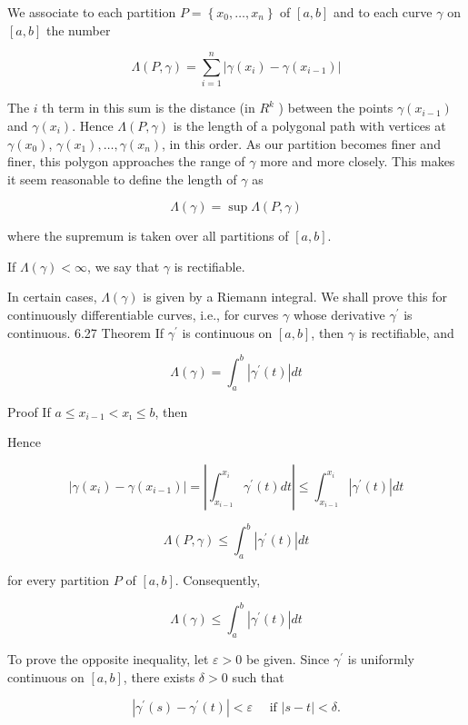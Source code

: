 \documentclass[10pt]{article}
\begin{document}
We associate to each partition $P=\left\{x_{0}, \ldots, x_{n}\right\}$ of $[a, b]$ and to each curve $\gamma$ on $[a, b]$ the number

$$
\Lambda(P, \gamma)=\sum_{i=1}^{n}\left|\gamma\left(x_{i}\right)-\gamma\left(x_{i-1}\right)\right|
$$

The $i$ th term in this sum is the distance (in $R^{k}$ ) between the points $\gamma\left(x_{i-1}\right)$ and $\gamma\left(x_{i}\right)$. Hence $\Lambda(P, \gamma)$ is the length of a polygonal path with vertices at $\gamma\left(x_{0}\right)$, $\gamma\left(x_{1}\right), \ldots, \gamma\left(x_{n}\right)$, in this order. As our partition becomes finer and finer, this polygon approaches the range of $\gamma$ more and more closely. This makes it seem reasonable to define the length of $\gamma$ as

$$
\Lambda(\gamma)=\sup \Lambda(P, \gamma)
$$

where the supremum is taken over all partitions of $[a, b]$.

If $\Lambda(\gamma)<\infty$, we say that $\gamma$ is rectifiable.

In certain cases, $\Lambda(\gamma)$ is given by a Riemann integral. We shall prove this for continuously differentiable curves, i.e., for curves $\gamma$ whose derivative $\gamma^{\prime}$ is continuous. 6.27 Theorem If $\gamma^{\prime}$ is continuous on $[a, b]$, then $\gamma$ is rectifiable, and

$$
\Lambda(\gamma)=\int_{a}^{b}\left|\gamma^{\prime}(t)\right| d t
$$

Proof If $a \leq x_{i-1}<x_{\imath} \leq b$, then

Hence

$$
\left|\gamma\left(x_{i}\right)-\gamma\left(x_{i-1}\right)\right|=\left|\int_{x_{i-1}}^{x_{i}} \gamma^{\prime}(t) d t\right| \leq \int_{x_{i-1}}^{x_{i}}\left|\gamma^{\prime}(t)\right| d t
$$

$$
\Lambda(P, \gamma) \leq \int_{a}^{b}\left|\gamma^{\prime}(t)\right| d t
$$

for every partition $P$ of $[a, b]$. Consequently,

$$
\Lambda(\gamma) \leq \int_{a}^{b}\left|\gamma^{\prime}(t)\right| d t
$$

To prove the opposite inequality, let $\varepsilon>0$ be given. Since $\gamma^{\prime}$ is uniformly continuous on $[a, b]$, there exists $\delta>0$ such that

$$
\left|\gamma^{\prime}(s)-\gamma^{\prime}(t)\right|<\varepsilon \quad \text { if }|s-t|<\delta .
$$
\end{document}
